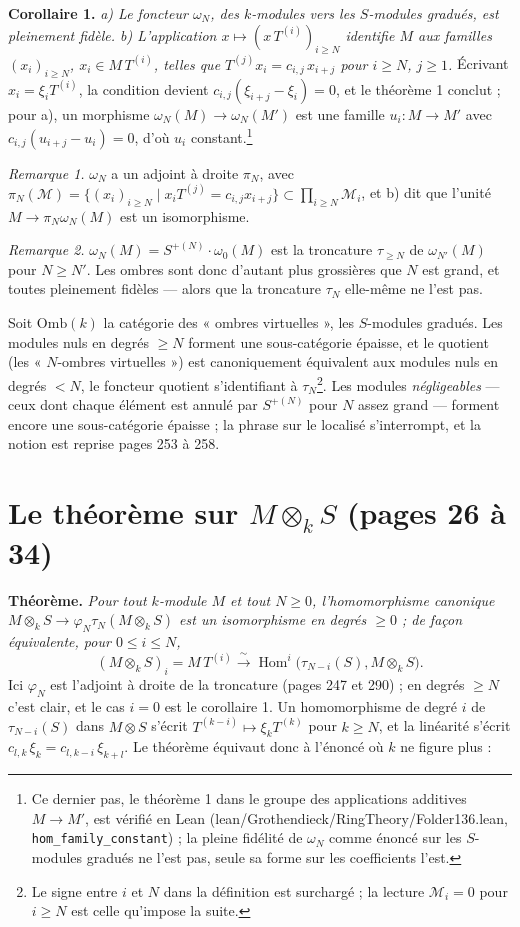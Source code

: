 \documentclass[11pt,a4paper]{article}
\begin{document}
\textbf{Corollaire 1.} \emph{a) Le foncteur $\omega_N$, des $k$-modules vers les
$S$-modules gradués, est pleinement fidèle. b) L'application $x \mapsto (x\,
T^{(i)})_{i \geq N}$ identifie $M$ aux familles $(x_i)_{i \geq N}$, $x_i \in M\,
T^{(i)}$, telles que $T^{(j)} x_i = c_{i,j}\, x_{i+j}$ pour $i \geq N$, $j \geq
1$.} Écrivant $x_i = \xi_i T^{(i)}$, la condition devient $c_{i,j}(\xi_{i+j} -
\xi_i) = 0$, et le théorème 1 conclut ; pour a), un morphisme
$\omega_N(M) \to \omega_N(M')$ est une famille $u_i : M \to M'$ avec
$c_{i,j}(u_{i+j} - u_i) = 0$, d'où $u_i$ constant.\footnote{Ce dernier pas,
le théorème 1 dans le groupe des applications additives $M \to M'$, est
vérifié en Lean (lean/Grothendieck/RingTheory/Folder136.lean,
\texttt{hom\_family\_constant}) ; la pleine fidélité de $\omega_N$ comme
énoncé sur les $S$-modules gradués ne l'est pas, seule sa forme sur les
coefficients l'est.}

\emph{Remarque 1.} $\omega_N$ a un adjoint à droite $\pi_N$, avec
$\pi_N(\mathcal{M}) = \{(x_i)_{i \geq N} \mid x_i T^{(j)} = c_{i,j} x_{i+j}\}
\subset \prod_{i \geq N} \mathcal{M}_i$, et b) dit que l'unité $M \to
\pi_N \omega_N(M)$ est un isomorphisme.

\emph{Remarque 2.} $\omega_N(M) = S^{+(N)} \cdot \omega_0(M)$ est la troncature
$\tau_{\geq N}$ de $\omega_{N'}(M)$ pour $N \geq N'$. Les ombres sont donc
d'autant plus grossières que $N$ est grand, et toutes pleinement fidèles —
alors que la troncature $\tau_N$ elle-même ne l'est pas.

Soit $\mathrm{Omb}(k)$ la catégorie des « ombres virtuelles », les
$S$-modules gradués. Les modules nuls en degrés $\geq N$ forment une
sous-catégorie épaisse, et le quotient (les « $N$-ombres virtuelles ») est
canoniquement équivalent aux modules nuls en degrés $< N$, le foncteur quotient
s'identifiant à $\tau_N$\footnote{Le signe entre $i$ et $N$ dans la définition
est surchargé ; la lecture $\mathcal{M}_i = 0$ pour $i \geq N$ est celle
qu'impose la suite.}. Les modules \emph{négligeables} — ceux dont chaque élément
est annulé par $S^{+(N)}$ pour $N$ assez grand — forment encore une
sous-catégorie épaisse ; la phrase sur le localisé s'interrompt, et la notion
est reprise pages 253 à 258.

\section*{Le théorème sur $M \otimes_k S$ (pages 26 à 34)}

\textbf{Théorème.} \emph{Pour tout $k$-module $M$ et tout $N \geq 0$,
l'homomorphisme canonique $M \otimes_k S \to \varphi_N \tau_N(M \otimes_k S)$
est un isomorphisme en degrés $\geq 0$ ; de façon équivalente, pour $0 \leq i
\leq N$,}
\[
(M \otimes_k S)_i = M\, T^{(i)} \xrightarrow{\ \sim\ } \operatorname{Hom}^i\bigl(\tau_{N-i}(S), M \otimes_k S\bigr) .
\]
Ici $\varphi_N$ est l'adjoint à droite de la troncature (pages 247 et 290) ; en
degrés $\geq N$ c'est clair, et le cas $i = 0$ est le corollaire 1. Un
homomorphisme de degré $i$ de $\tau_{N-i}(S)$ dans $M \otimes S$ s'écrit
$T^{(k-i)} \mapsto \xi_k T^{(k)}$ pour $k \geq N$, et la linéarité s'écrit
$c_{l,k}\,\xi_k = c_{l,k-i}\,\xi_{k+l}$. Le théorème équivaut donc à l'énoncé
où $k$ ne figure plus :
\end{document}
